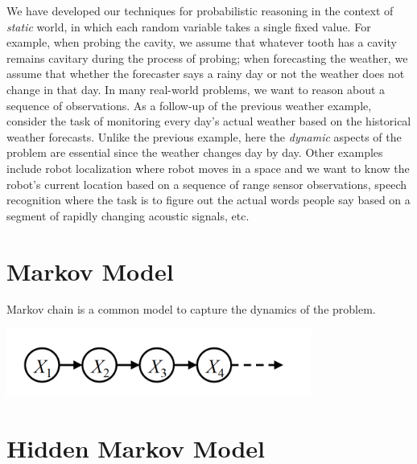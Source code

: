 \documentclass[11pt,fleqn]{article}
\def\title{Note \the\lecturenumber}
\begin{document}
\maketitle

We have developed our techniques for probabilistic reasoning in the context of \textit{static} world, in which each random variable takes a single fixed value. For example, when probing the cavity, we assume that whatever tooth has a cavity remains cavitary during the process of probing; when forecasting the weather, we assume that whether the forecaster says a rainy day or not the weather does not change in that day. In many real-world problems, we want to reason about a sequence of observations. As a follow-up of the previous weather example, consider the task of monitoring every day's actual weather based on the historical weather forecasts. Unlike the previous example, here the \textit{dynamic} aspects of the problem are essential since the weather changes day by day. Other examples include robot localization where robot moves in a space and we want to know the robot's current location based on a sequence of range sensor observations, speech recognition where the task is to figure out the actual words people say based on a segment of rapidly changing acoustic signals, etc. 

\section{Markov Model}
Markov chain is a common model to capture the dynamics of the problem. 

\begin{center}	
	\includegraphics[width=10cm]{img/mc}
\end{center} 





\section{Hidden Markov Model}
\end{document}
